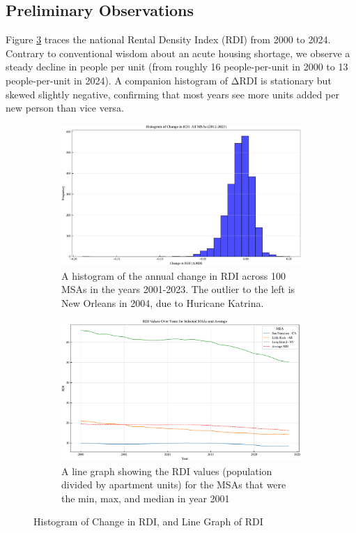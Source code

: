 \documentclass[APA,Times1COL]{WileyNJDv5} %
\begin{document}
\subsection{Preliminary Observations}

Figure \ref{fig:sidebyside} traces the national Rental Density Index (RDI) from 2000 to 2024. Contrary to conventional wisdom about an acute housing shortage, we observe a steady decline in people per unit (from roughly 16 people-per-unit in 2000 to 13 people-per-unit in 2024). A companion histogram of ΔRDI is stationary but skewed slightly negative, confirming that most years see more units added per new person than vice versa.

\begin{figure}[!htb]
	\centering
	\begin{subfigure}[b]{0.48\textwidth}
		\centering
		\includegraphics[width=\textwidth]{rdi_growth_histogram.pdf}
		\caption{A histogram of the annual change in RDI across 100 MSAs in the years 2001-2023. The outlier to the left is New  Orleans in 2004, due to Huricane Katrina.\label{fig:rdi_hist}}
	\end{subfigure}
	\hfill
	\begin{subfigure}[b]{0.48\textwidth}
		\centering
		\includegraphics[width=\textwidth]{rdi_trends_selected_msas.pdf}
		\caption{A line graph showing the RDI values (population divided by apartment units) for the MSAs that were the min, max, and median in year 2001}
		\label{fig:rdi_lines}
	\end{subfigure}
	\caption{Histogram of Change in RDI, and Line Graph of RDI}
	\label{fig:sidebyside}
\end{figure}
\end{document}
